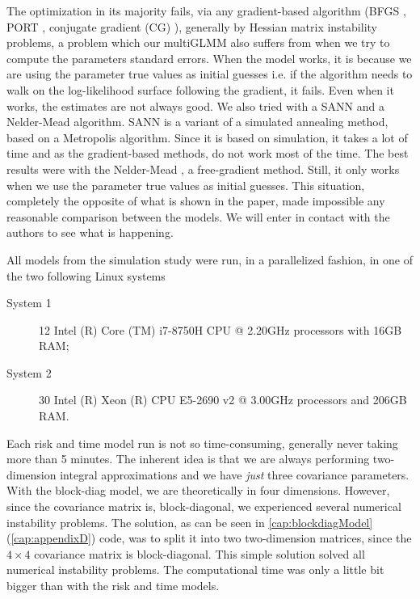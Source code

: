 The optimization in its majority fails, via any gradient-based algorithm
(BFGS \cite{nocedal&wright}, PORT \cite{PORTreport, PORTpaper},
conjugate gradient (CG) \cite{CG}), generally by Hessian matrix
instability problems, a problem which our multiGLMM also suffers from
when we try to compute the parameters standard errors. When the model
works, it is because we are using the parameter true values as initial
guesses i.e. if the algorithm needs to walk on the log-likelihood
surface following the gradient, it fails. Even when it works, the
estimates are not always good. We also tried with a SANN and a
Nelder-Mead algorithm. SANN \cite{SANN} is a variant of a simulated
annealing method, based on a Metropolis algorithm. Since it is based on
simulation, it takes a lot of time and as the gradient-based methods, do
not work most of the time. The best results were with the Nelder-Mead
\cite{neldermead}, a free-gradient method. Still, it only works when we
use the parameter true values as initial guesses. This situation,
completely the opposite of what is shown in the paper, made impossible
any reasonable comparison between the models. We will enter in contact
with the authors to see what is happening.

All models from the simulation study were run, in a parallelized
fashion, in one of the two following Linux systems
\begin{description}
 \item[System 1]
  12 Intel (R) Core (TM) i7-8750H CPU @ 2.20GHz processors
  with 16GB RAM;
 \item[System 2]
  30 Intel (R) Xeon (R) CPU E5-2690 v2 @ 3.00GHz processors
  and 206GB RAM.
\end{description}

Each risk and time model run is not so time-consuming, generally never
taking more than 5 minutes. The inherent idea is that we are always
performing two-dimension integral approximations and we have
\textit{just} three covariance parameters. With the block-diag model, we
are theoretically in four dimensions. However, since the covariance
matrix is, block-diagonal, we experienced several numerical instability
problems. The solution, as can be seen in \autoref{cap:blockdiagModel}
(\autoref{cap:appendixD}) code, was to split it into two two-dimension
matrices, since the \(4\times4\) covariance matrix is block-diagonal.
This simple solution solved all numerical instability problems. The
computational time was only a little bit bigger than with the risk and
time models.

